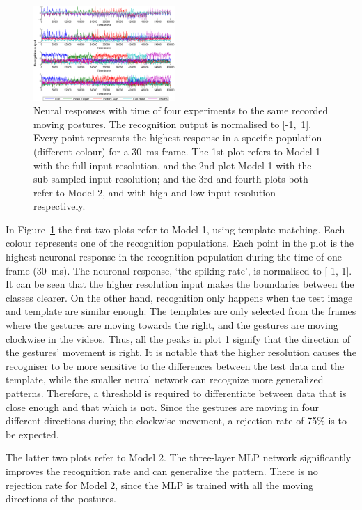 \documentclass[journal]{journal}
\begin{document}
\begin{figure}
\centering
	\includegraphics[width=0.48\textwidth]{pics/rateMatlab.pdf}
	\caption{Neural responses with time of four experiments to the same recorded moving postures.
	The recognition output is normalised to \mbox{[-1, 1]}.
	Every point represents the highest response in a specific population (different colour) for a 30~ms frame.
	The 1st plot refers to Model 1 with the full input resolution, and the 2nd plot Model 1 with the sub-sampled input resolution; and the 3rd and fourth plots both refer to Model 2, and with high and low input resolution respectively. 
	}
	\label{fig:matlabrec}
\end{figure}




In Figure~\ref{fig:matlabrec} the first two plots refer to Model 1, using template matching. Each colour represents one of the recognition populations. 
Each point in the plot is the highest neuronal response in the recognition population during the time of one frame (30~ms). 
The neuronal response, `the spiking rate', is normalised to [-1, 1]. 
It can be seen that the higher resolution input makes the boundaries between the classes clearer. 
On the other hand, recognition only happens when the test image and template are similar enough. 
The templates are only selected from the frames where the gestures are moving towards the right, and the gestures are moving clockwise in the videos. 
Thus, all the peaks in plot 1 signify that the direction of the gestures’ movement is right.  
It is notable that the higher resolution causes the recogniser to be more sensitive to the differences between the test data and the template, while the smaller neural network can recognize more generalized patterns. 
Therefore, a threshold is required to differentiate between data that is close enough and that which is not. 
Since the gestures are moving in four different directions during the clockwise movement, a rejection rate of 75\% is to be expected. 

The latter two plots refer to Model 2. 
The three-layer MLP network significantly improves the recognition rate and can generalize the pattern. 
There is no rejection rate for Model 2, since the MLP is trained with all the moving directions of the postures.
\end{document}
